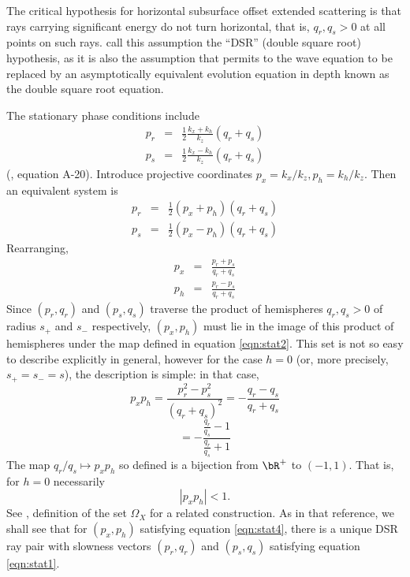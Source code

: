 The critical hypothesis for horizontal subsurface offset extended
scattering is that rays carrying significant energy do not turn
horizontal, that is, $q_r, q_s > 0$ at all points on such
rays. \cite{deHoopStolk:05,deHoopStolk:06} call this assumption the
``DSR'' (double square root) hypothesis, as it is also the assumption
that permits to the wave equation to be replaced by an asymptotically
equivalent evolution equation in depth known as the double square root equation.

The stationary phase conditions include 
\begin{eqnarray}
p_r & = & \frac{1}{2}\frac{k_x+k_h}{k_z}(q_r+q_s) \nonumber \\
\label{eqn:stat}
p_s & = & \frac{1}{2}\frac{k_x-k_h}{k_z}(q_r+q_s) 
\end{eqnarray}
(\cite[]{HouSymes:15}, equation A-20). Introduce projective
coordinates $p_x=k_x/k_z,
p_h=k_h/k_z$. Then an equivalent system is
\begin{eqnarray}
p_r & = & \frac{1}{2}(p_x+p_h)(q_r+q_s) \nonumber \\
\label{eqn:stat1}
p_s & = & \frac{1}{2}(p_x-p_h)(q_r+q_s) 
\end{eqnarray}
Rearranging,
\begin{eqnarray}
p_x & = &\frac{p_r+p_s}{q_r+q_s} \nonumber \\
\label{eqn:stat2}
p_h & = &\frac{p_r-p_s}{q_r+q_s} 
\end{eqnarray}
Since $(p_r,q_r)$ and $(p_s,q_s)$ traverse the product of hemispheres
$q_r,q_s > 0$ of
radius $s_+$ and $s_-$ respectively, $(p_x,p_h)$ must lie in the image
of this product of hemispheres under the map defined in equation
\ref{eqn:stat2}. This set is not so easy to describe explicitly in
general, however for the case $h=0$ (or, more precisely, $s_+=s_-=s$),
the description is simple: in that case, 
\[
p_xp_h = \frac{p_r^2-p_s^2}{(q_r+q_s)^2} = - \frac{q_r-q_s}{q_r+q_s}
\]
\begin{equation}
\label{eqn:stat3}
=-\frac{\frac{q_r}{q_s}-1}{\frac{q_r}{q_s}+1}
\end{equation}
The map $q_r/q_s \mapsto p_xp_h$ so defined is a bijection from
$\bR^+$ to $(-1,1)$. That is, for $h=0$ necessarily
\begin{equation}
\label{eqn:stat4}
|p_xp_h| < 1.
\end{equation}
See \cite[]{tenKroode:12}, definition of the set $\Omega_X$ for a related
construction. As in that reference, we shall see that for $(p_x,p_h)$
satisfying equation \ref{eqn:stat4}, there is a unique DSR ray pair
with slowness vectors $(p_r,q_r)$ and $(p_s,q_s)$ satisfying equation 
\ref{eqn:stat1}.

